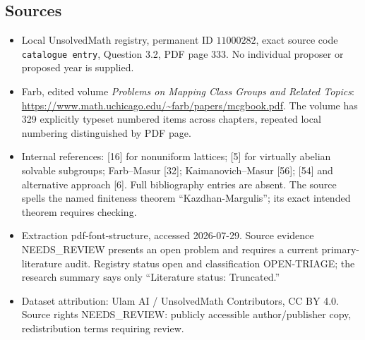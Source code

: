 \documentclass[11pt]{article}
\begin{document}
\subsection{Sources}
\begin{itemize}
\item Local UnsolvedMath registry, permanent ID \(11000282\), exact source code \texttt{catalogue entry}, Question 3.2, PDF page 333. No individual proposer or proposed year is supplied.
\item Farb, edited volume \emph{Problems on Mapping Class Groups and Related Topics}: \url{https://www.math.uchicago.edu/~farb/papers/mcgbook.pdf}. The volume has 329 explicitly typeset numbered items across chapters, repeated local numbering distinguished by PDF page.
\item Internal references: [16] for nonuniform lattices; [5] for virtually abelian solvable subgroups; Farb--Masur [32]; Kaimanovich--Masur [56]; [54] and alternative approach [6]. Full bibliography entries are absent. The source spells the named finiteness theorem ``Kazdhan-Margulis''; its exact intended theorem requires checking.
\item Extraction pdf-font-structure, accessed 2026-07-29. Source evidence NEEDS\_REVIEW presents an open problem and requires a current primary-literature audit. Registry status open and classification OPEN-TRIAGE; the research summary says only ``Literature status: Truncated.''
\item Dataset attribution: Ulam AI / UnsolvedMath Contributors, CC BY 4.0. Source rights NEEDS\_REVIEW: publicly accessible author/publisher copy, redistribution terms requiring review.
\end{itemize}
\end{document}
